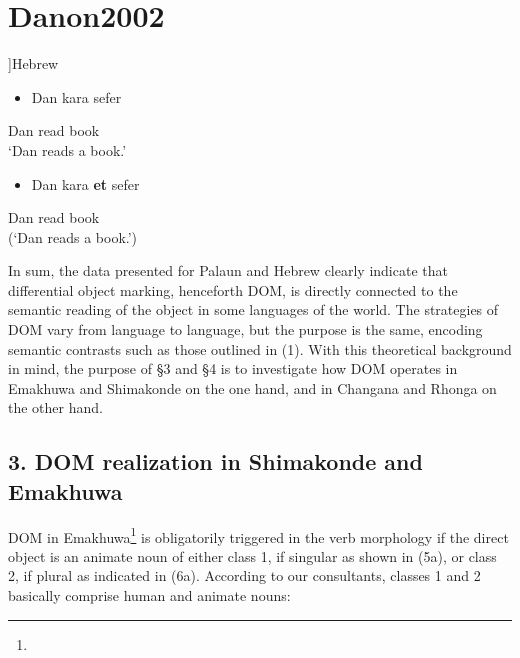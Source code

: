 \documentclass[output=paper]{langsci/langscibook}
\begin{document}
\chapter[Hebrew \citep[1]{Danon2002}]{Hebrew \citep[1]{Danon2002}}
\setcounter{itemize}{0}
\begin{itemize}
\item \gll Dan         kara                 sefer\\
\end{itemize}
     Dan         read                  book\\
\glt ‘Dan reads a book.’
\z

\begin{itemize}
\item \gll *Dan        kara        \textbf{et}      sefer\\
\end{itemize}
     Dan          read        \textstyleFontepargpadroi{   }book\\
\glt (‘Dan reads a book.’)
\z

In sum, the data presented for Palaun and Hebrew clearly indicate that differential object marking, henceforth DOM, is directly connected to the semantic reading of the object in some languages of the world. The strategies of DOM vary from language to language, but the purpose is the same, encoding semantic contrasts such as those outlined in (1). With this theoretical background in mind, the purpose of §3 and §4 is to investigate how DOM operates in Emakhuwa and Shimakonde on the one hand, and in Changana and Rhonga on the other hand.

\section{ 3. DOM realization in Shimakonde and Emakhuwa}

DOM in Emakhuwa\footnote{} is obligatorily triggered in the verb morphology if the direct object is an animate noun of either class 1, if singular as shown in (5a), or class 2, if plural as indicated in (6a). According to our consultants, classes 1 and 2 basically comprise human and animate nouns:
\end{document}
